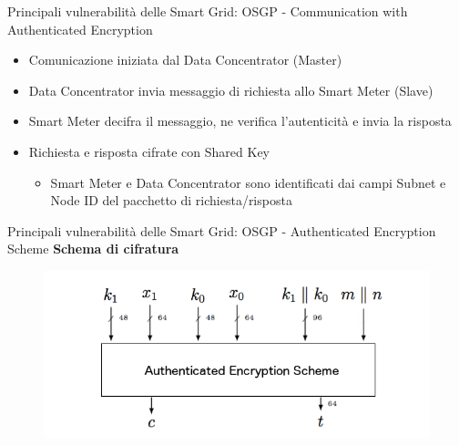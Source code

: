 \begin{frame}{Principali vulnerabilità delle Smart Grid: OSGP - Communication with Authenticated Encryption}
	\begin{itemize}[<+- | alert@+>]
		\item Comunicazione iniziata dal Data Concentrator (Master)
		\item Data Concentrator invia messaggio di richiesta allo Smart Meter (Slave)
		\item Smart Meter decifra il messaggio, ne verifica l'autenticità e invia la risposta
		\item Richiesta e risposta cifrate con Shared Key
		\begin{itemize}
			\item Smart Meter e Data Concentrator sono identificati dai campi Subnet e Node ID del pacchetto di richiesta/risposta
		\end{itemize}
	\end{itemize}
\end{frame}

\begin{frame}{Principali vulnerabilità delle Smart Grid: OSGP - Authenticated Encryption Scheme}
	\textbf{Schema di cifratura}
	\begin{figure}[h] 
		\includegraphics[scale=0.4,cfbox=blue_slides 1pt 0pt]{imgs/c_scheme.png}
	\end{figure}
\end{frame}

